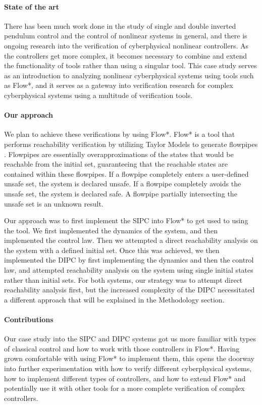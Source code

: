 \documentclass{article}
\theoremstyle{plain}
\theoremstyle{definition}
\theoremstyle{remark}
\begin{document}
\paragraph{State of the art}
There has been much work done in the study of single and double inverted pendulum control and the control of nonlinear systems in general, and there is ongoing research into the verification of cyberphysical nonlinear controllers. As the controllers get more complex, it becomes necessary to combine and extend the functionality of tools rather than using a singular tool. This case study serves as an introduction to analyzing nonlinear cyberphysical systems using tools such as Flow*, and it serves as a gateway into verification research for complex cyberphysical systems using a multitude of verification tools.

\paragraph{Our approach}
We plan to achieve these verifications by using Flow*. Flow* is a tool that performs reachability verification by utilizing Taylor Models to generate flowpipes \cite{FlowStar}. Flowpipes are essentially overapproximations of the states that would be reachable from the initial set, guaranteeing that the reachable states are contained within these flowpipes. If a flowpipe completely enters a user-defined unsafe set, the system is declared unsafe. If a flowpipe completely avoids the unsafe set, the system is declared safe. A flowpipe partially intersecting the unsafe set is an unknown result.

Our approach was to first implement the SIPC into Flow* to get used to using the tool. We first implemented the dynamics of the system, and then implemented the control law. Then we attempted a direct reachability analysis on the system with a defined initial set. Once this was achieved, we then implemented the DIPC by first implementing the dynamics and then the control law, and attempted reachability analysis on the system using single initial states rather than initial sets. For both systems, our strategy was to attempt direct reachability analysis first, but the increased complexity of the DIPC necessitated a different approach that will be explained in the Methodology section.

\paragraph{Contributions}
Our case study into the SIPC and DIPC systems got us more familiar with types of classical control and how to work with those controllers in Flow*. Having grown comfortable with using Flow* to implement them, this opens the doorway into further experimentation with how to verify different cyberphysical systems, how to implement different types of controllers, and how to extend Flow* and potentially use it with other tools for a more complete verification of complex controllers.
\end{document}

